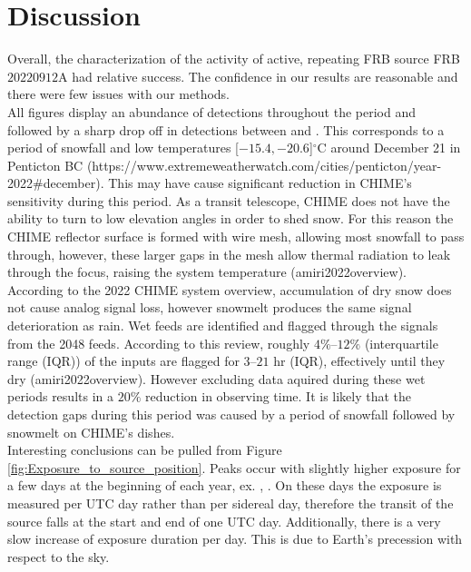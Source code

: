 \documentclass[twocolumn]{aastex631}
\begin{document}
\section{Discussion}
\label{sec:Discussion}

Overall, the characterization of the activity of active, repeating FRB source FRB$20220912$A had relative success. The confidence in our results are reasonable and there were few issues with our methods.\\
\indent All figures display an abundance of detections throughout the period  and  followed by a sharp drop off in detections between  and . This corresponds to a period of snowfall and low temperatures [$-15.4, -20.6$]$^{\circ}$C around December 21 in Penticton BC (https://www.extremeweatherwatch.com/cities/penticton/year-2022#december). This may have cause significant reduction in CHIME's sensitivity during this period. As a transit telescope, CHIME does not have the ability to turn to low elevation angles in order to shed snow. For this reason the CHIME reflector surface is formed with wire mesh, allowing most snowfall to pass through, however, these larger gaps in the mesh allow thermal radiation to leak through the focus, raising the system temperature (amiri2022overview). According to the 2022 CHIME system overview, accumulation of dry snow does not cause analog signal loss, however snowmelt produces the same signal deterioration as rain. Wet feeds are identified and flagged through the signals from the 2048 feeds. According to this review, roughly $4\%–12\%$ (interquartile range (IQR)) of the inputs are flagged for $3–21$ hr (IQR), effectively until they dry (amiri2022overview). However excluding data aquired during these wet periods results in a $20\%$ reduction in observing time. It is likely that the detection gaps during this period was caused by a period of snowfall followed by snowmelt on CHIME's dishes.\\
\indent Interesting conclusions can be pulled from Figure \ref{fig:Exposure_to_source_position}. Peaks occur with slightly higher exposure for a few days at the beginning of each year, ex. , . On these days the exposure is measured per UTC day rather than per sidereal day, therefore the transit of the source falls at the start and end of one UTC day. Additionally, there is a very slow increase of exposure duration per day. This is due to Earth's precession with respect to the sky.\\
\end{document}
